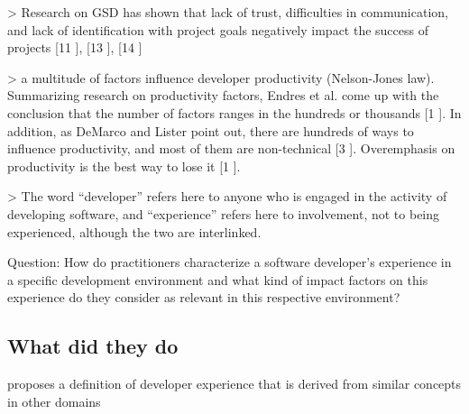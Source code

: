 > Research on GSD has shown
that lack of trust, difficulties in communication, and lack
of identification with project goals negatively impact the
success of projects [11 \cite{smiteEmpiricalEvidenceGlobal2010}], [13 \cite{holmstromAgilePracticesReduce2006}], [14 \cite{hymanCreativeChaosHighperformance1993}]

> a multitude of factors influence developer productivity (Nelson-Jones law).
Summarizing research on productivity factors, Endres et al.
come up with the conclusion that the number of factors
ranges in the hundreds or thousands [1 \cite{endresHandbookSoftwareSystems2003}]. In addition, as
DeMarco and Lister point out, there are hundreds of ways to
influence productivity, and most of them are non-technical
[3 \cite{demarcoProgrammerPerformanceEffects1985}]. Overemphasis on productivity is the best way to lose it [1 \cite{endresHandbookSoftwareSystems2003}].

> The word “developer” refers here to anyone who is engaged in the activity of developing software, and “experience” refers here to involvement, not to being experienced, although the two are interlinked.

Question: How do practitioners characterize a
software developer’s experience in a specific development
environment and what kind of impact factors on this experience do they consider as relevant in this respective
environment?

\subsection{What did they do}

proposes a definition of developer experience that is derived from similar concepts in other domains
